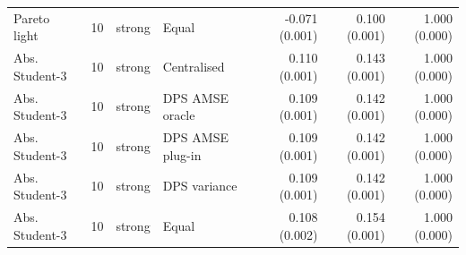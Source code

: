 \begin{tabular}{lrllrrr}
Pareto light & 10 & strong & Equal & -0.071 (0.001) & 0.100 (0.001) & 1.000 (0.000) \\
Abs. Student-3 & 10 & strong & Centralised & 0.110 (0.001) & 0.143 (0.001) & 1.000 (0.000) \\
Abs. Student-3 & 10 & strong & DPS AMSE oracle & 0.109 (0.001) & 0.142 (0.001) & 1.000 (0.000) \\
Abs. Student-3 & 10 & strong & DPS AMSE plug-in & 0.109 (0.001) & 0.142 (0.001) & 1.000 (0.000) \\
Abs. Student-3 & 10 & strong & DPS variance & 0.109 (0.001) & 0.142 (0.001) & 1.000 (0.000) \\
Abs. Student-3 & 10 & strong & Equal & 0.108 (0.002) & 0.154 (0.001) & 1.000 (0.000) \\
\bottomrule
\end{tabular}
